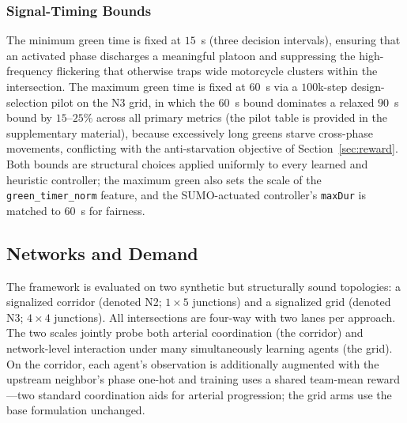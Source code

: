 \subsubsection{Signal-Timing Bounds}
The minimum green time is fixed at $15$~s (three decision intervals), ensuring that an
activated phase discharges a meaningful platoon and suppressing the high-frequency
flickering that otherwise traps wide motorcycle clusters within the intersection. The
maximum green time is fixed at $60$~s via a $100$k-step design-selection pilot on the N3
grid, in which the $60$~s bound dominates a relaxed $90$~s bound by $15$--$25\%$ across
all primary metrics (the pilot table is provided in the supplementary material), because
excessively long greens starve cross-phase movements, conflicting with the
anti-starvation objective of Section~\ref{sec:reward}. Both bounds are structural choices
applied uniformly to every learned and heuristic controller; the maximum green also sets
the scale of the \texttt{green\_timer\_norm} feature, and the SUMO-actuated controller's
\texttt{maxDur} is matched to $60$~s for fairness.

\subsection{Networks and Demand}
\label{sec:networks}
The framework is evaluated on two synthetic but structurally sound topologies: a
signalized corridor (denoted N2; $1 \times 5$ junctions) and a signalized grid
(denoted N3; $4 \times 4$ junctions). All intersections are four-way with two lanes per approach. The two scales
jointly probe both arterial coordination (the corridor) and network-level interaction under
many simultaneously learning agents (the grid). On the corridor, each agent's observation is
additionally augmented with the upstream neighbor's phase one-hot and training uses a shared
team-mean reward---two standard coordination aids for arterial progression; the grid arms use
the base formulation unchanged.

